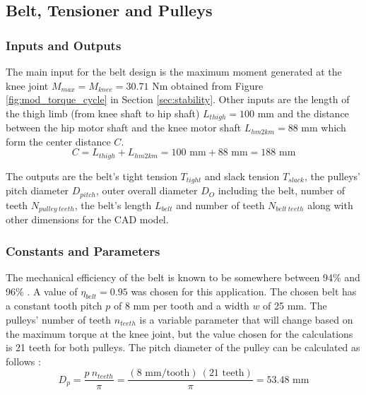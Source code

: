 \subsection{Belt, Tensioner and Pulleys} \label{subsec:belt}

\subsubsection{Inputs and Outputs}

The main input for the belt design is the maximum moment generated at the knee joint $M_{max} = M_{knee} = 30.71 \text{ Nm}$ obtained from Figure \ref{fig:mod_torque_cycle} in Section \ref{sec:stability}.
Other inputs are the length of the thigh limb (from knee shaft to hip shaft) $L_{thigh} = 100 \text{ mm}$ and the distance between the hip motor shaft and the knee motor shaft $L_{hm2km} = 88 \text{ mm}$ which form the center distance $C$. 
\begin{equation}
    C = L_{thigh} + L_{hm2km} = 100\text{ mm} + 88\text{ mm} = 188\text{ mm}
\end{equation}

The outputs are the belt's tight tension $T_{tight}$ and slack tension $T_{slack}$, the pulleys' pitch diameter $D_{pitch}$, outer overall diameter $D_O$ including the belt, number of teeth $N_{pulley\  teeth}$, the belt's length $L_{belt}$ and number of teeth $N_{belt\ teeth}$ along with other dimensions for the CAD model.

\subsubsection{Constants and Parameters}

The mechanical efficiency of the belt is known to be somewhere between 94\% and 96\% \cite{gates_mectrol_timing_2006}. A value of $\eta_{belt} = 0.95$ was chosen for this application. The chosen belt has a constant tooth pitch $p$ of 8 mm per tooth and a width $w$ of 25 mm. The pulleys' number of teeth $n_{teeth}$ is a variable parameter that will change based on the maximum torque at the knee joint, but the value chosen for the calculations is 21 teeth for both pulleys. The pitch diameter of the pulley can be calculated as follows \cite{gates_mectrol_timing_2006}:
\begin{equation}
    D_p = \frac{p\ n_{teeth}}{\pi} = \frac{(8\text{ mm/tooth})\ (21 \text{ teeth})}{\pi} = 53.48\text{ mm}
\end{equation}
